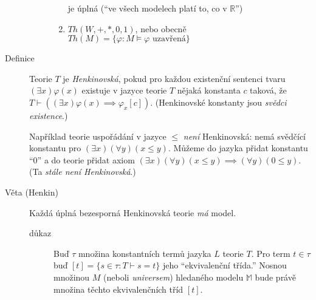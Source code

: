 \documentclass[a4paper]{article}
\begin{document}
\begin{description}
\begin{description}
\begin{enumerate}
							je úplná (\enquote{ve všech modelech platí to, co v $\mathbb{R}$})
						\item $Th(W, +, *, 0, 1)$, nebo obecně
							$Th(M) = \{\varphi : M \models \varphi \text{ uzavřená}\}$
					\end{enumerate}
			\end{description}
		\item[Definice] Teorie $T$ je \textit{Henkinovská}, pokud pro každou existenční
			sentenci tvaru $(\exists x) \varphi(x)$ existuje v jazyce teorie $T$
			nějaká konstanta $c$ taková, že
			$T \vdash ((\exists x) \varphi(x) \implies \varphi_x[c])$.
			(Henkinovské konstanty jsou \textit{svědci existence}.)

			Například teorie uspořádání v jazyce $\le$ \textit{není} Henkinovská:
			nemá svědčící konstantu pro $(\exists x)(\forall y)(x \le y)$.
			Můžeme do jazyka přidat konstantu \enquote{$0$} a do teorie
			přidat axiom $(\exists x)(\forall y)(x \le y) \implies (\forall y)(0 \le y)$.
			(Ta \textit{stále není Henkinovská}.)
		\item[Věta (Henkin)] Každá úplná bezesporná Henkinovská teorie \textit{má} model.
			\begin{description}
				\item[důkaz] Buď $\tau$ množina konstantních termů jazyka $L$ teorie $T$.
					Pro term $t \in \tau$ buď $[t] = \{s \in \tau : T \vdash s = t\}$ jeho
					\enquote{ekvivalenční třída.} Nosnou množinou $M$ (neboli \textit{universem})
					hledaného modelu $\mathbb{M}$ bude právě množina těchto ekvivalenčních tříd
					$[t]$.


\end{description}
\end{description}
\end{document}
